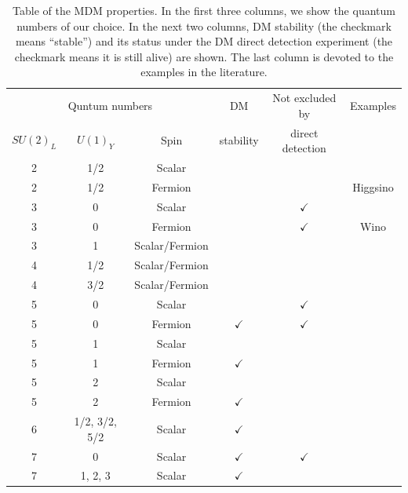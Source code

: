 \documentclass[12pt,twoside,book]{article}
\begin{document}
\begin{table}
  \centering
  \begin{tabular}{ccc|c|c|c}
    \multicolumn{3}{c|}{Quntum numbers} & DM & Not excluded by & Examples\\
    $SU(2)_L$ & $U(1)_Y$ & Spin & stability & direct detection & \\ \hline
    \hline
    2 & 1/2 & Scalar & & & \\
    2 & 1/2 & Fermion & & & Higgsino\\ \hline
    3 & 0 & Scalar & & $\checkmark$ & \cite{Farina:2013mla} \\
    3 & 0 & Fermion & & $\checkmark$ & Wino\\
    3 & 1 & Scalar/Fermion & & & \cite{Farina:2013mla} \\ \hline
    4 & 1/2 & Scalar/Fermion & & & \cite{Farina:2013mla} \\
    4 & 3/2 & Scalar/Fermion & & & \cite{Farina:2013mla} \\ \hline
    5 & 0 & Scalar & & $\checkmark$ & \cite{Farina:2013mla} \\
    5 & 0 & Fermion & $\checkmark$ & $\checkmark$ &
      \cite{Cirelli:2005uq, Cirelli:2007xd, Cirelli:2009uv} \\
    5 & 1 & Scalar & & & \\
    5 & 1 & Fermion & $\checkmark$ & & \\
    5 & 2 & Scalar & & & \\
    5 & 2 & Fermion & $\checkmark$ & & \\ \hline
    6 & 1/2, 3/2, 5/2 & Scalar & $\checkmark$ & & \\ \hline
    7 & 0 & Scalar & $\checkmark$ & $\checkmark$ &
      \cite{Cirelli:2005uq, Cirelli:2007xd, Cirelli:2009uv} \\
    7 & 1, 2, 3 & Scalar & $\checkmark$ & & \\
  \end{tabular}
  \caption{
    Table of the MDM properties.
    In the first three columns, we show the quantum numbers of our choice.
    In the next two columns, DM stability (the checkmark means ``stable'') and its status under the DM direct detection experiment (the checkmark means it is still alive) are shown.
    The last column is devoted to the examples in the literature.
  }
  \label{tab:mdms}
\end{table}
\end{document}

